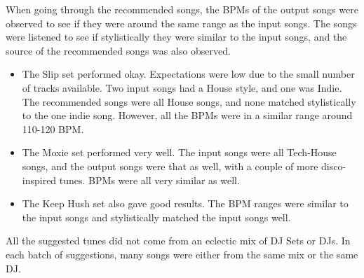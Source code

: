 When going through the recommended songs, the BPMs of the output songs were observed to see if they were around the same range as the input songs. The songs were listened to see if stylistically they were similar to the input songs, and the source of the recommended songs was also observed.

\begin{itemize}
	\item The Slip set performed okay. Expectations were low due to the small number of tracks available. Two input songs had a House style, and one was Indie. The recommended songs were all House songs, and none matched stylistically to the one indie song. However, all the BPMs were in a similar range around 110-120 BPM.
	\item The Moxie set performed very well. The input songs were all Tech-House songs, and the output songs were that as well, with a couple of more disco-inspired tunes. BPMs were all very similar as well.  
	\item The Keep Hush set also gave good results. The BPM ranges were similar to the input songs and stylistically matched the input songs well. 
\end{itemize}

All the suggested tunes did not come from an eclectic mix of DJ Sets or DJs. In each batch of suggestions, many songs were either from the same mix or the same DJ. 

